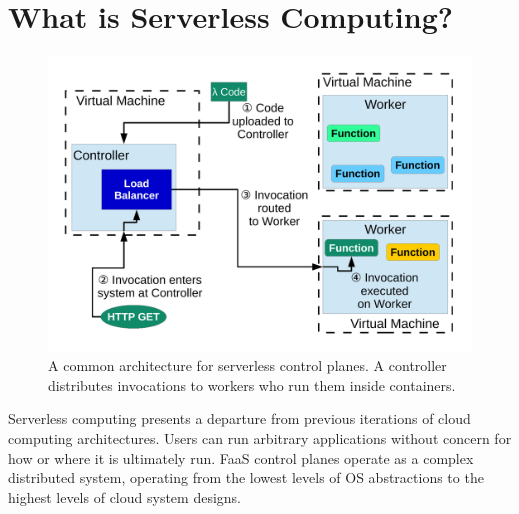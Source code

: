 \section{What is Serverless Computing?}
\label{sec:serverless-computing}

\begin{figure}
  \begin{center}
    \includegraphics[width=.9\columnwidth]{./figures/sys-diag.pdf}
  \caption{A common architecture for serverless control planes. 
          A controller distributes invocations to workers who run them inside containers.}
  \label{fig:serverless-arch}
\end{center}
\end{figure}

Serverless computing presents a departure from previous iterations of cloud computing architectures.
Users can run arbitrary applications without concern for how or where it is ultimately run.
FaaS control planes operate as a complex distributed system, operating from the lowest levels of OS abstractions to the highest levels of cloud system designs.

